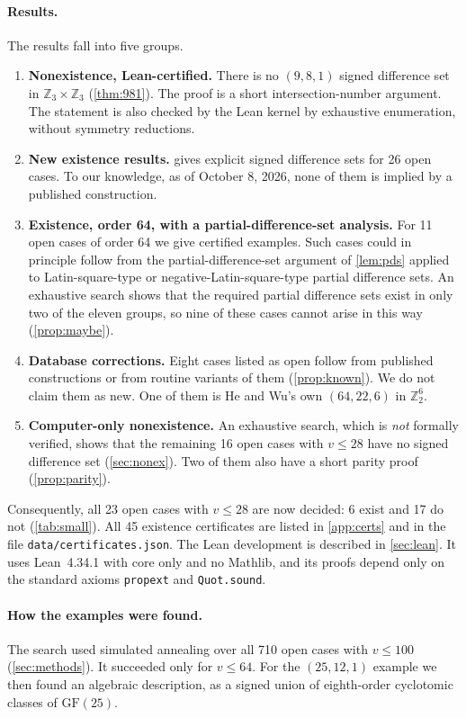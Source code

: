 \documentclass[11pt]{article}
\numberwithin{equation}{section}
\theoremstyle{definition}
\theoremstyle{remark}
\newcommand{\Z}{\mathbb Z}
\newcommand{\GF}{\mathrm{GF}}
\begin{document}
\paragraph{Results.} The results fall into five groups.
\begin{enumerate}
\item[(d)] \textbf{Nonexistence, Lean-certified.} There is no $(9,8,1)$ signed difference set in
$\Z_3\times\Z_3$ (\cref{thm:981}). The proof is a short intersection-number argument. The
statement is also checked by the Lean kernel by exhaustive enumeration, without symmetry
reductions.
\item[(a)] \textbf{New existence results.}  gives explicit signed difference sets for 26
open cases. To our knowledge, as of October 8, 2026, none of them is implied by a published
construction.
\item[(b)] \textbf{Existence, order 64, with a partial-difference-set analysis.} For 11 open cases of
order 64 we give certified examples. Such cases could in principle follow from the
partial-difference-set argument of \cref{lem:pds} applied to Latin-square-type or
negative-Latin-square-type partial difference sets. An exhaustive search shows that the required
partial difference sets exist in only two of the eleven groups, so nine of these cases cannot
arise in this way (\cref{prop:maybe}).
\item[(c)] \textbf{Database corrections.} Eight cases listed as open follow from published
constructions or from routine variants of them (\cref{prop:known}). We do not claim them as new.
One of them is He and Wu's own $(64,22,6)$ in $\Z_2^6$.
\item[(e)] \textbf{Computer-only nonexistence.} An exhaustive search, which is \emph{not} formally
verified, shows that the remaining 16 open cases with $v\le 28$ have no signed difference set
(\cref{sec:nonex}). Two of them also have a short parity proof (\cref{prop:parity}).
\end{enumerate}
Consequently, all 23 open cases with $v\le 28$ are now decided: 6 exist and 17 do not
(\cref{tab:small}). All 45 existence certificates are listed in \cref{app:certs} and in the
file \texttt{data/certificates.json}. The Lean development is described in \cref{sec:lean}.
It uses Lean~4.34.1 with core only and no Mathlib, and its proofs depend only on the standard
axioms \texttt{propext} and \texttt{Quot.sound}.

\paragraph{How the examples were found.} The search used simulated annealing over all 710 open
cases with $v\le100$ (\cref{sec:methods}). It succeeded only for $v\le 64$. For the $(25,12,1)$
example we then found an algebraic description, as a signed union of eighth-order cyclotomic
classes of $\GF(25)$.
\end{document}
